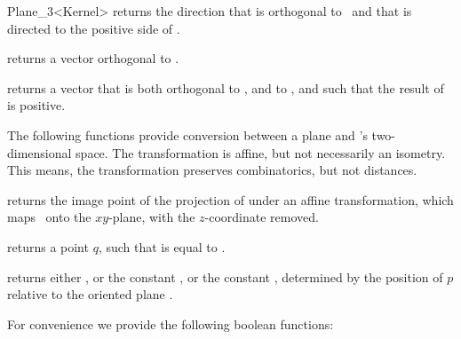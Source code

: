\begin{ccRefClass} {Plane_3<Kernel>}
       {returns the direction that is orthogonal to \ccVar\ and that
        is directed to the positive side of \ccVar.}

       {returns a vector orthogonal to 
        .}

       {returns a vector that is both orthogonal to ,
        and to , and such that the result of 
         is positive.}


The following functions provide conversion between a plane and 
\cgal's two-dimensional space. The transformation is affine, but
not necessarily an isometry. This means, the transformation preserves
combinatorics, but not distances.

       {returns the image point of the projection of  
       under an affine transformation, which maps \ccVar\ onto the 
       $xy$-plane, with the $z$-coordinate removed.}

       {returns a point $q$, such that 
        is equal to .}

\ccPredicates

       {returns either , or
        the constant , or the con\-stant
        , 
        determined by the position of $p$ relative to the oriented plane \ccVar.
        }

For convenience we provide the following boolean functions:

       {}
\ccGlue
{}
       {}
\ccGlue
{}
       {}

       {}


\end{ccRefClass}
